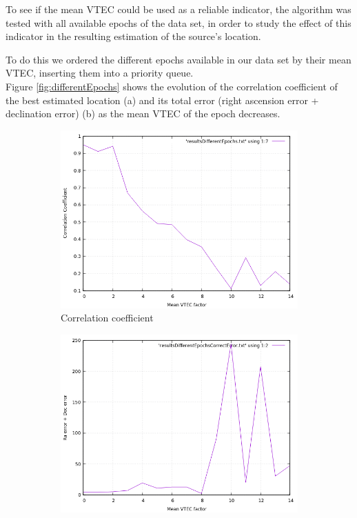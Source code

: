 To see if the mean VTEC could be used as a reliable indicator, the algorithm was tested with all available epochs of the data set, in order to study the effect of this indicator in the resulting estimation of the source's location.

To do this we ordered the different epochs available in our data set by their mean VTEC, inserting them into a priority queue. \\

Figure \ref{fig:differentEpochs} shows the evolution of the correlation coefficient of the best estimated location (a) and its total error (right ascension error + declination error) (b) as the mean VTEC of the epoch decreases.

\clearpage

\begin{figure}[!htb]
	\begin{subfigure}[b]{0.5\textwidth}
		\includegraphics[width=\linewidth]{images/ch6/spikes/correlationDecrease.png}
		\caption{Correlation coefficient}
	\end{subfigure}
	\hfill
	\begin{subfigure}[b]{0.5\textwidth}
		\includegraphics[width=\linewidth]{images/ch6/spikes/decreaseRangeError.png}

\end{subfigure}
\end{figure}

